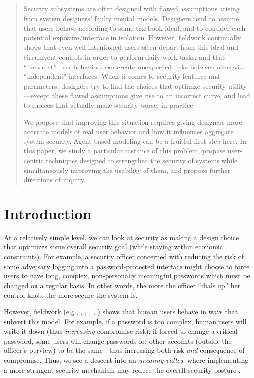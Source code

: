 \documentclass{acm_proc_article-sp}
\newcommand{\ignore}[1] {}
\begin{document}
\begin{abstract}
Security subsystems are often designed with flawed assumptions arising from 
system designers' faulty mental models. 
Designers tend to assume that users behave according to some textbook ideal,
and to consider each potential exposure/interface in isolation.
However, fieldwork 
continually shows that even well-intentioned users often depart from this ideal
and circumvent controls in order to perform daily work tasks, and
that ``incorrect'' user behaviors can create unexpected links between 
otherwise ``independent" interfaces.
When it comes to security features and parameters,
designers try to find the choices that optimize security utility---except
these flawed assumptions give rise to an incorrect curve, and lead
to choices that actually make security worse, in practice.

We propose that improving this situation requires giving designers more
accurate models of real user behavior and how it influences aggregate system
security. Agent-based modeling can be a fruitful 
first step here.
In this paper, we study a
particular instance of this problem, propose
user-centric techniques designed to strengthen the security of systems
while simultaneously improving the usability of them, and propose
further directions of inquiry.
\end{abstract}

\section{Introduction}

At a relatively simple level, we can look at security as making a
design choice that optimizes some overall security goal (while staying
within economic constraints).  For example, a security officer
concerned with reducing the risk of some adversary logging into a
password-protected interface might choose to force users to have long,
complex, non-personally meaningful passwords which must be changed on
a regular basis.  In other words, the more the officer ``dials up''
her control knob, the more secure the system is.

However, fieldwork (e.g., \cite{blythe2013circumvention}, \cite{DP00},
\cite{florencio2007large}, \cite{gaw2006password},
\cite{riley2006password}) shows that human users behave in ways that
subvert this model.  For example, if a password is too complex, human
users will write it down (thus {\em increasing} compromise risk); if
forced to change a critical password, some users will change passwords
for other accounts (outside the officer's purview) to be the
same---thus increasing both risk {\em and} consequence of compromise.
Thus, we see a descent into an \textit{uncanny valley}: where
implementing a more stringent security mechanism may reduce the
overall security posture \cite{mori70}.
%
\ignore{Thus, what seems to be a simple monotonic relationship may in fact harbor
what graphics specialists call {\em uncanny valleys}: places where
dialing up the controls actually decreases overall security posture.}
\end{document}
